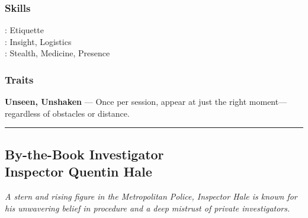 \begin{paracol}{3}
        \switchcolumn      
        \subsubsection{Skills}
            \noindent\Expert: Etiquette \\
            \noindent\Skilled: Insight, Logistics \\
            \noindent\Novice: Stealth, Medicine, Presence \\
        \subsubsection{Traits}
          \textbf{Unseen, Unshaken} — Once per session, appear at just the right moment—regardless of obstacles or distance.
      
    \end{paracol}
    \vspace{.5\baselineskip}
    \hrule
    \vspace{.5\baselineskip}

    \subsection{{\small By-the-Book Investigator}\\ Inspector Quentin Hale}
    \label{npc:inspector-hale}
    
    \emph{A stern and rising figure in the Metropolitan Police, Inspector Hale is known for his unwavering belief in procedure and a deep mistrust of private investigators.}
    \vspace{.5\baselineskip}
    
